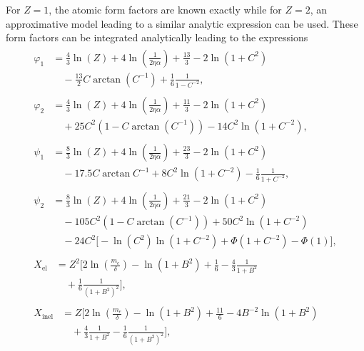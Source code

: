 For $Z=1$, the atomic form factors are known exactly while for $Z=2$, an approximative model leading to a similar analytic expression can be used.
These form factors can be integrated analytically leading to the expressions \cite{RevModPhys.46.815}
%
\begingroup
\allowdisplaybreaks
\begin{align}
	\begin{split}
		\varphi_1 &= \frac{4}{3} \ln(Z) + 4 \ln\left(\frac{1}{2 \eta \alpha}\right) + \frac{13}{3} - 2 \ln(1 + C^2) \\&\quad- \frac{13}{2} C \arctan(C^{-1}) + \frac{1}{6}\frac{1}{1 - C^{-2}},
	\end{split}
	\\[2ex]
	\begin{split}
		\varphi_2 &= \frac{4}{3} \ln(Z) + 4 \ln\left(\frac{1}{2 \eta \alpha}\right) + \frac{11}{3} - 2 \ln(1 + C^2) \\&\quad+ 25 C^2 (1 - C \arctan(C^{-1})) - 14 C^2 \ln(1 + C^{-2}),
	\end{split}
	\\[2ex]
	\begin{split}
		\psi_1 &= \frac{8}{3} \ln(Z) + 4 \ln\left(\frac{1}{2 \eta \alpha}\right) + \frac{23}{3} - 2 \ln (1 + C^2) \\&\quad- 17.5 C \arctan{C^{-1}} + 8 C^2 \ln(1 + C^{-2}) - \frac{1}{6}\frac{1}{1 + C^{-2}},
	\end{split}
	\\[2ex]
	\begin{split}
		\psi_2 &= \frac{8}{3} \ln(Z) + 4 \ln\left(\frac{1}{2 \eta \alpha}\right) + \frac{21}{3} - 2 \ln (1 + C^2) \\&\quad- 105 C^2 (1 - C \arctan(C^{-1})) + 50 C^2 \ln(1 + C^{-2}) \\&\quad- 24 C^2 \biggl[ - \ln(C^2) \ln(1 + C^{-2}) + \Phi(1 + C^{-2}) - \Phi(1) \biggr],
	\end{split}
	\\[2ex]
	\begin{split}
		X_{\text{el}} &= Z^2 \biggl[ 2 \ln\left(\frac{m_e}{\delta}\right) - \ln(1 + B^2) + \frac{1}{6} - \frac{4}{3} \frac{1}{1 + B^2} \\&\quad+ \frac{1}{6} \frac{1}{(1 + B^2)^2} \biggr], 
	\end{split}
	\\[2ex]
	\begin{split}
		X_{\text{inel}} &= Z \biggl[ 2 \ln\left(\frac{m_e}{\delta}\right) - \ln(1 + B^2) + \frac{11}{6} - 4 B^{-2} \ln(1 + B^2) \\&\quad+ \frac{4}{3} \frac{1}{1 + B^2} - \frac{1}{6} \frac{1}{(1 + B^2)^2} \biggr],
	\end{split}
\end{align}
